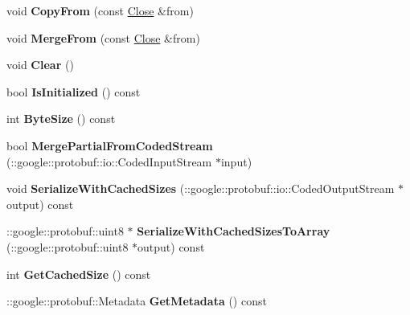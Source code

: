\begin{DoxyCompactItemize}
\item 
\hypertarget{class_close_a104d789ceecc954d91da7df0f107779f}{void {\bfseries Copy\-From} (const \hyperlink{class_close}{Close} \&from)}\label{class_close_a104d789ceecc954d91da7df0f107779f}

\item 
\hypertarget{class_close_a37c912bb9f92cdfaa33a7ce8d8ee130e}{void {\bfseries Merge\-From} (const \hyperlink{class_close}{Close} \&from)}\label{class_close_a37c912bb9f92cdfaa33a7ce8d8ee130e}

\item 
\hypertarget{class_close_afda54c6204c3922e74fc47c60a108220}{void {\bfseries Clear} ()}\label{class_close_afda54c6204c3922e74fc47c60a108220}

\item 
\hypertarget{class_close_a5aebc81fadea648480666a41fe66c3cb}{bool {\bfseries Is\-Initialized} () const }\label{class_close_a5aebc81fadea648480666a41fe66c3cb}

\item 
\hypertarget{class_close_a2421ad573317a21c714c039851fa1220}{int {\bfseries Byte\-Size} () const }\label{class_close_a2421ad573317a21c714c039851fa1220}

\item 
\hypertarget{class_close_a381c8ce094e6dc74a20400ccbfaea748}{bool {\bfseries Merge\-Partial\-From\-Coded\-Stream} (\-::google\-::protobuf\-::io\-::\-Coded\-Input\-Stream $\ast$input)}\label{class_close_a381c8ce094e6dc74a20400ccbfaea748}

\item 
\hypertarget{class_close_aeb282667ae1da2dd18c98d7ca711bd88}{void {\bfseries Serialize\-With\-Cached\-Sizes} (\-::google\-::protobuf\-::io\-::\-Coded\-Output\-Stream $\ast$output) const }\label{class_close_aeb282667ae1da2dd18c98d7ca711bd88}

\item 
\hypertarget{class_close_ac660e547b27cd984e526c0e248c69222}{\-::google\-::protobuf\-::uint8 $\ast$ {\bfseries Serialize\-With\-Cached\-Sizes\-To\-Array} (\-::google\-::protobuf\-::uint8 $\ast$output) const }\label{class_close_ac660e547b27cd984e526c0e248c69222}

\item 
\hypertarget{class_close_af8b2e8fb8ce9a11e24e63494656a6b28}{int {\bfseries Get\-Cached\-Size} () const }\label{class_close_af8b2e8fb8ce9a11e24e63494656a6b28}

\item 
\hypertarget{class_close_a8ce129c6a94a5d6c4b664c6642d1d751}{\-::google\-::protobuf\-::\-Metadata {\bfseries Get\-Metadata} () const }\label{class_close_a8ce129c6a94a5d6c4b664c6642d1d751}


\end{DoxyCompactItemize}
